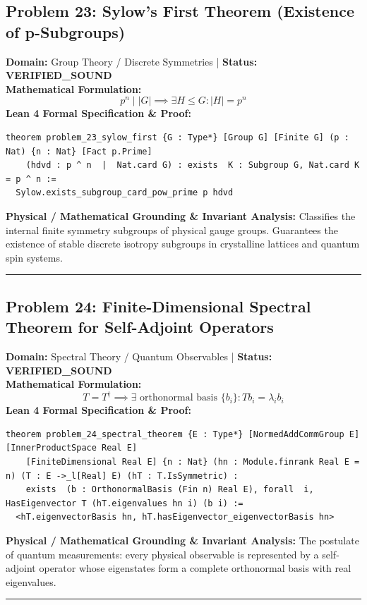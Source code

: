 \documentclass[10pt,a4paper]{article}
\begin{document}
\subsection*{Problem 23: Sylow's First Theorem (Existence of p-Subgroups)}
\textbf{Domain:} Group Theory / Discrete Symmetries \quad | \quad \textbf{Status:} \textcolor{green!70!black}{\textbf{VERIFIED\_SOUND}}\\
\textbf{Mathematical Formulation:}
\begin{equation*}
  p^n \mid |G| \implies \exists H \le G: |H| = p^n
\end{equation*}
\textbf{Lean 4 Formal Specification \& Proof:}
\begin{lstlisting}
theorem problem_23_sylow_first {G : Type*} [Group G] [Finite G] (p : Nat) {n : Nat} [Fact p.Prime]
    (hdvd : p ^ n  |  Nat.card G) : exists  K : Subgroup G, Nat.card K = p ^ n :=
  Sylow.exists_subgroup_card_pow_prime p hdvd
\end{lstlisting}
\textbf{Physical / Mathematical Grounding \& Invariant Analysis:}
Classifies the internal finite symmetry subgroups of physical gauge groups. Guarantees the existence of stable discrete isotropy subgroups in crystalline lattices and quantum spin systems.
\vspace{0.8em}\hrule\vspace{0.8em}
\subsection*{Problem 24: Finite-Dimensional Spectral Theorem for Self-Adjoint Operators}
\textbf{Domain:} Spectral Theory / Quantum Observables \quad | \quad \textbf{Status:} \textcolor{green!70!black}{\textbf{VERIFIED\_SOUND}}\\
\textbf{Mathematical Formulation:}
\begin{equation*}
  T = T^\dagger \implies \exists \text{ orthonormal basis } \{b_i\}: T b_i = \lambda_i b_i
\end{equation*}
\textbf{Lean 4 Formal Specification \& Proof:}
\begin{lstlisting}
theorem problem_24_spectral_theorem {E : Type*} [NormedAddCommGroup E] [InnerProductSpace Real E]
    [FiniteDimensional Real E] {n : Nat} (hn : Module.finrank Real E = n) (T : E ->_l[Real] E) (hT : T.IsSymmetric) :
    exists  (b : OrthonormalBasis (Fin n) Real E), forall  i, HasEigenvector T (hT.eigenvalues hn i) (b i) :=
  <hT.eigenvectorBasis hn, hT.hasEigenvector_eigenvectorBasis hn>
\end{lstlisting}
\textbf{Physical / Mathematical Grounding \& Invariant Analysis:}
The postulate of quantum measurements: every physical observable is represented by a self-adjoint operator whose eigenstates form a complete orthonormal basis with real eigenvalues.
\vspace{0.8em}\hrule\vspace{0.8em}
\end{document}

